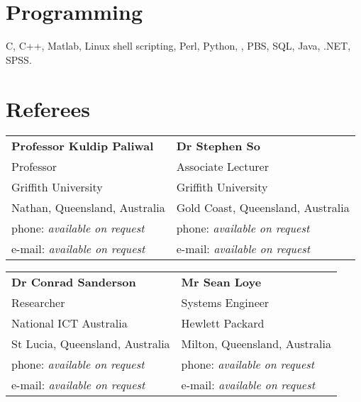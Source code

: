 \documentclass[margin,line]{resumeFormat2}
\begin{document}
\begin{resumeFormat2}
    \section{\mysidestyle Programming} 

    C, C++, Matlab, Linux shell scripting, Perl, Python, \LaTeXe, PBS, SQL, Java, .NET, SPSS.






\section{\mysidestyle Referees} 

\begin{tabular}{@{}p{6cm}p{6cm}}
\textbf{Professor Kuldip Paliwal}       &  \textbf{Dr Stephen So}                   \\
Professor                               &  Associate Lecturer                       \\
Griffith University                     &  Griffith University                      \\
Nathan, Queensland, Australia           &  Gold Coast, Queensland, Australia        \\
phone: \textsl{available on request}    &  phone: \textsl{available on request}     \\
e-mail: \textsl{available on request}   &  e-mail: \textsl{available on request}    \\
\end{tabular}

\begin{tabular}{@{}p{6cm}p{6cm}}
\textbf{Dr Conrad Sanderson}            &  \textbf{Mr Sean Loye}                    \\
Researcher                              &  Systems Engineer                         \\
National ICT Australia                  &  Hewlett Packard                          \\
St Lucia, Queensland, Australia         &  Milton, Queensland, Australia            \\
phone: \textsl{available on request}    &  phone: \textsl{available on request}     \\
e-mail: \textsl{available on request}   &  e-mail: \textsl{available on request}    \\
\end{tabular}



\end{resumeFormat2}
\end{document}
